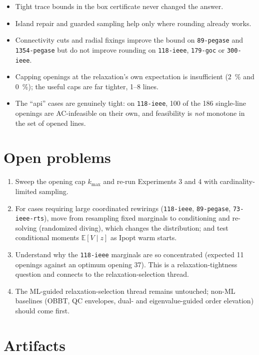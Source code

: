 \documentclass[11pt]{article}
\newcommand{\code}[1]{\texttt{\small #1}}
\begin{document}
\begin{itemize}
  \item Tight trace bounds in the box certificate never changed the answer.
  \item Island repair and guarded sampling help only where rounding already works.
  \item Connectivity cuts and radial fixings improve the bound on \code{89-pegase} and
        \code{1354-pegase} but do not improve rounding on \code{118-ieee}, \code{179-goc} or
        \code{300-ieee}.
  \item Capping openings at the relaxation's own expectation is insufficient (\SI{2}{\percent} and
        \SI{0}{\percent}); the useful caps are far tighter, 1--8 lines.
  \item The ``api'' cases are genuinely tight: on \code{118-ieee}, 100 of the 186 single-line openings
        are AC-infeasible on their own, and feasibility is \emph{not} monotone in the set of opened
        lines.
\end{itemize}

\section{Open problems}

\begin{enumerate}
  \item Sweep the opening cap $k_{\max}$ and re-run Experiments 3 and 4 with cardinality-limited
        sampling.
  \item For cases requiring large coordinated rewirings (\code{118-ieee}, \code{89-pegase},
        \code{73-ieee-rts}), move from resampling fixed marginals to conditioning and re-solving
        (randomized diving), which changes the distribution; and test conditional moments
        $\mathbb{E}[V \mid z]$ as Ipopt warm starts.
  \item Understand why the \code{118-ieee} marginals are so concentrated (expected 11 openings against
        an optimum opening 37). This is a relaxation-tightness question and connects to the
        relaxation-selection thread.
  \item The ML-guided relaxation-selection thread remains untouched; non-ML baselines (OBBT, QC
        envelopes, dual- and eigenvalue-guided order elevation) should come first.
\end{enumerate}

\section*{Artifacts}
\end{document}
